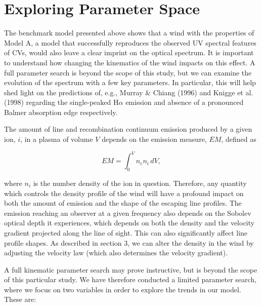 \documentclass[preprint, a4paper, 11pt]{aastex}
\begin{document}



%
%

\section{Exploring Parameter Space}

The benchmark model presented above shows that a wind with the properties
of Model A, a model that successfully reproduces the observed UV spectral features
of CVs,
would also leave a clear imprint on the optical spectrum. It is important
to understand how changing the kinematics of the wind impacts on this
effect. A full parameter search is beyond the scope of this study, 
but we can examine the evolution
of the spectrum with a few key parameters. In particular, this
will help shed light on the predictions of, e.g., Murray \& Chiang (1996)
and Knigge et al. (1998) regarding the single-peaked H$\alpha$ emission
and absence of a pronounced Balmer absorption edge respectively.

The amount of line and recombination continuum
emission produced by a given ion, $i$, in a plasma of volume $V$
depends on the emission measure, $EM$, defined as

\begin{equation}
EM=\int^V_0 n_e n_i \,dV,
\end{equation}


where $n_i$ is the number density of the ion in question.    
Therefore, any quantity which controls the density profile of the wind
will have a profound impact on both the 
amount of emission and the shape of the escaping line profiles.
The emission reaching an observer at a given frequency
also depends on the Sobolev optical depth it experiences, which depends on both
the density and the velocity gradient projected
along the line of sight. This can also significantly affect line profile shapes.       
As described in section 3, we can alter the density in the wind by 
adjusting the velocity law (which also determines the velocity gradient). 

A full kinematic parameter search may prove instructive, but
is beyond the scope of this particular study.
We have therefore conducted a limited parameter 
search, where we focus on 
two variables in order to explore the trends in our model. 
These are:
\end{document}
